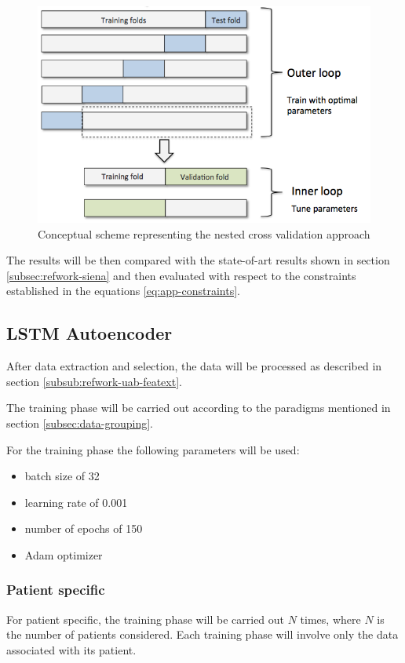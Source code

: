 \begin{figure}[ht]
    \centering
    \includegraphics[width=1.0\textwidth]{images/Experimental-validation/nested-crossval.png}
    \caption{Conceptual scheme representing the nested cross validation approach \cite{jacopo_repossi_tutorial_2022}}
    \label{fig:nested-crossval}
\end{figure}

The results will be then compared with the state-of-art results shown in section \ref{subsec:refwork-siena} and then evaluated with respect to the constraints established in the equations \ref{eq:app-constraints}.

\subsection{LSTM Autoencoder} \label{subsec:lstm-exp}
After data extraction and selection, the data will be processed as described in section \ref{subsub:refwork-uab-featext}.

The training phase will be carried out according to the paradigms mentioned in section \ref{subsec:data-grouping}.

For the training phase the following parameters will be used:
\begin{itemize}
    \item batch size of 32
    \item learning rate of 0.001
    \item number of epochs of 150
    \item Adam optimizer 
\end{itemize}

\subsubsection{Patient specific} \label{subsub:patient-specific-exp}
For patient specific, the training phase will be carried out $N$ times, where $N$ is the number of patients considered. Each training phase will involve only the data associated with its patient.

